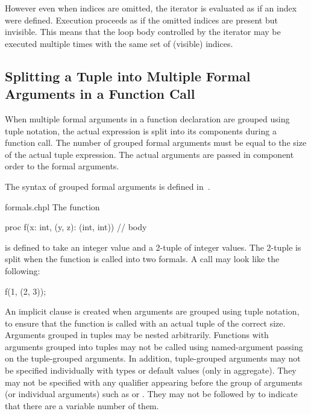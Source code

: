 However even when indices are omitted, the iterator is
evaluated as if an index were defined.  Execution proceeds as if the
omitted indices are present but invisible.  This means that the loop body
controlled by the iterator may be executed multiple times with the
same set of (visible) indices.

\subsection{Splitting a Tuple into Multiple Formal Arguments in a Function Call}
\label{Formal_Argument_Declarations_in_a_Tuple}

When multiple formal arguments in a function declaration are grouped
using tuple notation, the actual expression is split into its
components during a function call.  The number of grouped formal
arguments must be equal to the size of the actual tuple expression.
The actual arguments are passed in component order to the formal
arguments.

The syntax of grouped formal arguments is defined
in~.

\begin{chapelexample}{formals.chpl}
The function
\begin{chapel}
proc f(x: int, (y, z): (int, int)) {
  // body
}
\end{chapel}
is defined to take an integer value and a 2-tuple of integer values.
The 2-tuple is split when the function is called into two formals.  A
call may look like the following:
\begin{chapel}
f(1, (2, 3));
\end{chapel}
\begin{chapelpost}
\end{chapelpost}
\begin{chapeloutput}
\end{chapeloutput}
\end{chapelexample}

An implicit  clause is created when arguments are grouped using
tuple notation, to ensure that the function is called with an actual
tuple of the correct size.  Arguments grouped in tuples may be
nested arbitrarily.  Functions with arguments grouped into tuples may not be
called using named-argument passing on the tuple-grouped arguments.
In addition, tuple-grouped arguments may not be specified individually
with types or default values (only in aggregate).  They may not be
specified with any qualifier appearing before the group of arguments
(or individual arguments) such as  or .  They
may not be followed by  to indicate that there are a
variable number of them.

